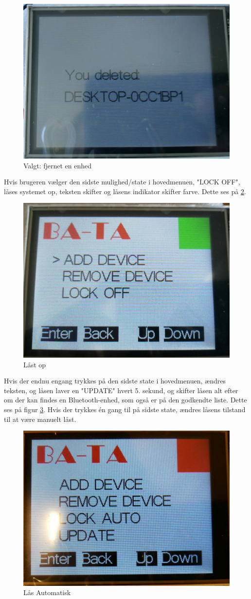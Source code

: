 \begin{figure}[H]
	\centering
	\includegraphics[width = 300 pt]{Img/delete.jpg}
	\caption{Valgt: fjernet en enhed}
	\label{fig:delete}
\end{figure}
Hvis brugeren vælger den sidste mulighed/state i hovedmenuen, "LOCK OFF", låses systemet op, teksten skifter og låsens indikator skifter farve. Dette ses på \ref{fig:lockOff}.
\begin{figure}[H]
	\centering
	\includegraphics[width = 300 pt]{Img/lockOff.jpg}
	\caption{Låst op}
	\label{fig:lockOff}
\end{figure}
Hvis der endnu engang trykkes på den sidste state i hovedmenuen, ændres teksten, og låsen laver en "UPDATE"  hvert 5. sekund, og skifter låsen alt efter om der kan findes en Bluetooth-enhed, som også er på den godkendte liste. Dette ses på figur \ref{fig:auto}. Hvis der trykkes én gang til på sidste state, ændres låsens tilstand til at være manuelt låst.
\begin{figure}[H]
	\centering
	\includegraphics[width = 300 pt]{Img/auto.jpg}
	\caption{Lås Automatisk}
	\label{fig:auto}
\end{figure}

